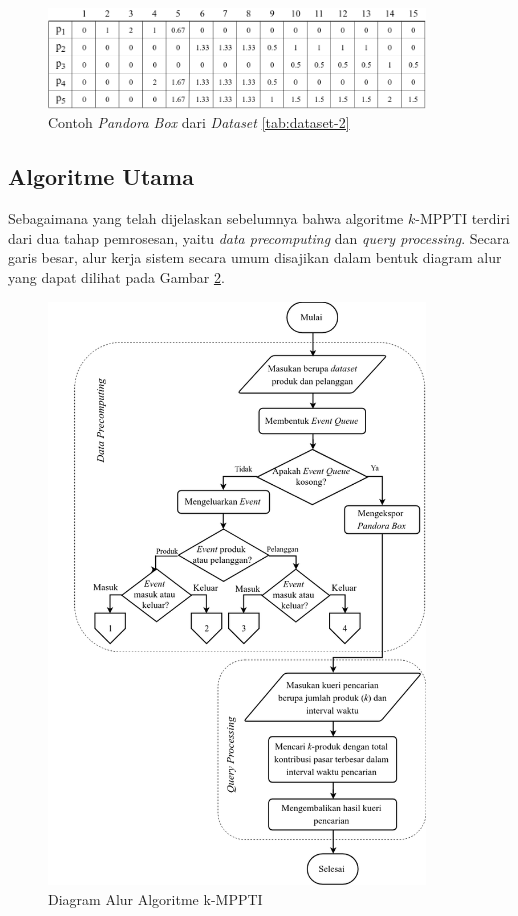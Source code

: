 \begin{figure}[h]
	\centering
	\includegraphics[width=10cm]{assets/img/bab3/pbox.png}
	\caption{Contoh \textit{Pandora Box} dari \textit{Dataset} \ref{tab:dataset-2}}
	\label{fig:pbox}
\end{figure}

\subsection{Algoritme Utama}
\tab Sebagaimana yang telah dijelaskan sebelumnya bahwa algoritme $k$-MPPTI terdiri dari dua tahap pemrosesan, yaitu \textit{data precomputing} dan \textit{query processing}. Secara garis besar, alur kerja sistem secara umum disajikan dalam bentuk diagram alur yang dapat dilihat pada Gambar \ref{fig:diagram-alur1}.

\begin{figure}[H]
	\centering
	\includegraphics[width=10cm]{assets/img/bab3/flowchart.png}
	\caption{Diagram Alur Algoritme k-MPPTI}
	\label{fig:diagram-alur1}
\end{figure}

